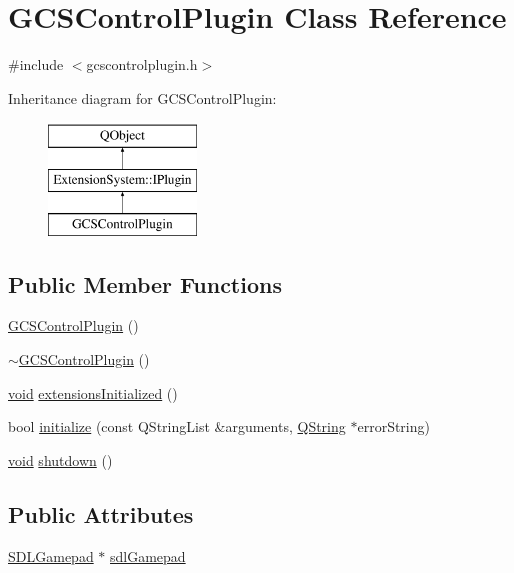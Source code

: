 \hypertarget{class_g_c_s_control_plugin}{\section{G\-C\-S\-Control\-Plugin Class Reference}
\label{class_g_c_s_control_plugin}
}


{\ttfamily \#include $<$gcscontrolplugin.\-h$>$}

Inheritance diagram for G\-C\-S\-Control\-Plugin\-:\begin{figure}[H]
\begin{center}
\leavevmode
\includegraphics[height=3.000000cm]{class_g_c_s_control_plugin}
\end{center}
\end{figure}
\subsection*{Public Member Functions}
\begin{DoxyCompactItemize}
\item 
\hyperlink{group___g_c_s_control_gadget_plugin_gaa5bf178769d6fdc89db0176db639c02a}{G\-C\-S\-Control\-Plugin} ()
\item 
\hyperlink{group___g_c_s_control_gadget_plugin_gaa8f4c5803ed27c6a490522181ad40efa}{$\sim$\-G\-C\-S\-Control\-Plugin} ()
\item 
\hyperlink{group___u_a_v_objects_plugin_ga444cf2ff3f0ecbe028adce838d373f5c}{void} \hyperlink{group___g_c_s_control_gadget_plugin_gad526ae3249e30303394221453d4483a2}{extensions\-Initialized} ()
\item 
bool \hyperlink{group___g_c_s_control_gadget_plugin_ga57b8a6ede4344b5a2e3e9460b158dde8}{initialize} (const Q\-String\-List \&arguments, \hyperlink{group___u_a_v_objects_plugin_gab9d252f49c333c94a72f97ce3105a32d}{Q\-String} $\ast$error\-String)
\item 
\hyperlink{group___u_a_v_objects_plugin_ga444cf2ff3f0ecbe028adce838d373f5c}{void} \hyperlink{group___g_c_s_control_gadget_plugin_ga4c6e2d64333994bacf7db3c918057799}{shutdown} ()
\end{DoxyCompactItemize}
\subsection*{Public Attributes}
\begin{DoxyCompactItemize}
\item 
\hyperlink{class_s_d_l_gamepad}{S\-D\-L\-Gamepad} $\ast$ \hyperlink{group___g_c_s_control_gadget_plugin_ga3cd3b8ed3b17b5405fb2f71803a65951}{sdl\-Gamepad}
\end{DoxyCompactItemize}


